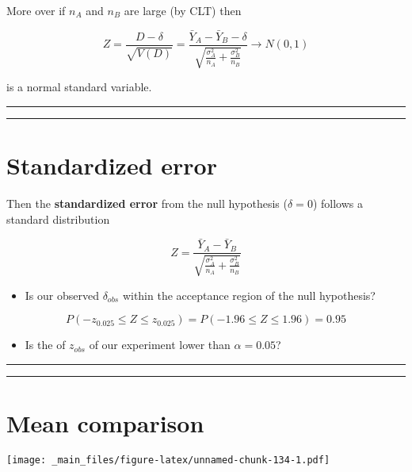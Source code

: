 \documentclass[
]{book}
\providecommand{\tightlist}{%
  \setlength{\itemsep}{0pt}\setlength{\parskip}{0pt}}
\begin{document}
More over if \(n_A\) and \(n_B\) are large (by CLT) then

\[Z=\frac{D-\delta}{\sqrt{V(D)}}=\frac{\bar{Y}_A-\bar{Y}_B -\delta}{\sqrt{\frac{\sigma^2_A}{n_A}+\frac{\sigma^2_B}{n_B}}} \rightarrow N(0,1)\]

is a normal standard variable.

\begin{center}\rule{0.5\linewidth}{0.5pt}\end{center}

\begin{center}\rule{0.5\linewidth}{0.5pt}\end{center}

\hypertarget{standardized-error}{%
\section{Standardized error}\label{standardized-error}}

Then the \textbf{standardized error} from the null hypothesis (\(\delta=0\)) follows a standard distribution

\[Z=\frac{\bar{Y}_A-\bar{Y}_B}{\sqrt{\frac{\sigma^2_A}{n_A}+\frac{\sigma^2_B}{n_B}}}\]

\begin{itemize}
\tightlist
\item
  Is our observed \(\delta_{obs}\) within the acceptance region of the null hypothesis?
\end{itemize}

\[P(-z_{0.025} \leq Z \leq z_{0.025})=P(-1.96 \leq Z \leq 1.96)=0.95\]

\begin{itemize}
\tightlist
\item
  Is the of \(z_{obs}\) of our experiment lower than \(\alpha=0.05\)?
\end{itemize}

\begin{center}\rule{0.5\linewidth}{0.5pt}\end{center}

\begin{center}\rule{0.5\linewidth}{0.5pt}\end{center}

\hypertarget{mean-comparison}{%
\section{Mean comparison}\label{mean-comparison}}

\texttt{[image: \_main\_files/figure-latex/unnamed-chunk-134-1.pdf]}
\end{document}
